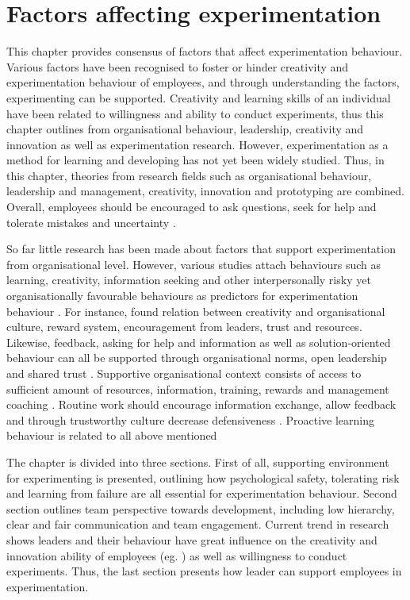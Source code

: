 \chapter{Factors affecting experimentation}
This chapter provides consensus of factors that affect experimentation behaviour. Various factors have been recognised to foster or hinder creativity and experimentation behaviour of employees, and through understanding the factors, experimenting can be supported. Creativity and learning skills of an individual have been related to willingness and ability to conduct experiments, thus this chapter outlines from organisational behaviour, leadership, creativity and innovation as well as experimentation research. However, experimentation as a method for learning and developing has not yet been widely studied. Thus, in this chapter, theories from research fields such as organisational behaviour, leadership and management, creativity, innovation and prototyping are combined. Overall, employees should be encouraged to ask questions, seek for help and tolerate mistakes and uncertainty \citep{edmondson1999psychological}.

So far little research has been made about factors that support experimentation from organisational level. However, various studies attach behaviours such as learning, creativity, information seeking and other interpersonally risky yet organisationally favourable behaviours as predictors for experimentation behaviour \citep{lee2004mixed,amabile1996assessing,argyris1994good,edmondson1996learning,edmondson2003speaking}. For instance, \citet{amabile1996assessing} found relation between creativity and organisational culture, reward system, encouragement from leaders, trust and resources. Likewise, feedback, asking for help and information as well as solution-oriented behaviour can all be supported through organisational norms, open leadership and shared trust \citep{ashford1992conveying,ashford1998out,lee1997going,morrison1993newcomer}. Supportive organisational context consists of access to sufficient amount of resources, information, training, rewards and management coaching \citep{edmondson1996learning}. Routine work should encourage information exchange, allow feedback and through trustworthy culture decrease defensiveness \citep{argyris1994good}. Proactive learning behaviour is related to all above mentioned \citep{edmondson2003speaking}

The chapter is divided into three sections. First of all, supporting environment for experimenting is presented, outlining how psychological safety, tolerating risk and learning from failure are all essential for experimentation behaviour. Second section outlines team perspective towards development, including low hierarchy, clear and fair communication and team engagement. Current trend in research shows leaders and their behaviour have great influence on the creativity and innovation ability of employees (eg. \citep{mumford2002leading,jung2001transformational,amabile1998kill}) as well as willingness to conduct experiments. Thus, the last section presents how leader can support employees in experimentation. 

